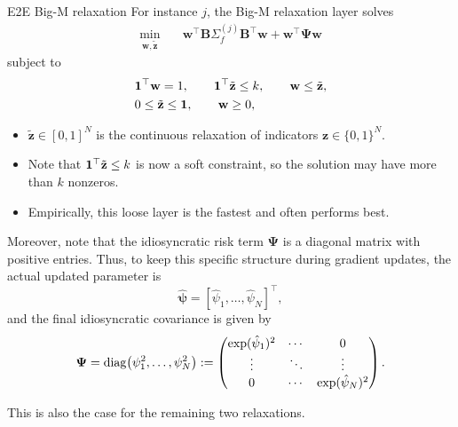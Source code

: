 \documentclass[10pt,aspectratio=169]{beamer}
\newcommand{\Nassets}{N}
\newcommand{\Kcard}{k}
\newcommand{\SigmaMat}{\Sigma}
\begin{document}
\begin{frame}[allowframebreaks]{E2E Big-M relaxation}
  \small 
  For instance $j$, the Big-M relaxation layer solves
  \[
  \begin{aligned}
    \min_{\mathbf w,\tilde{\mathbf z}}\quad 
    &  \mathbf w^\top \mathbf{B} \SigmaMat_f^{(j)} \mathbf{B}^\top \mathbf{w} + \mathbf{w}^\top \boldsymbol{\Psi} \mathbf{w}
    \end{aligned}
  \]
  subject to
  \[
  \begin{aligned}
    & \one^\top \mathbf w=1,\qquad
      \one^\top \tilde{\mathbf z}\le \Kcard,\qquad
      \mathbf w\le \tilde{\mathbf z},\\
    & 0\le \tilde{\mathbf z}\le \one,\qquad
      \mathbf w\ge0,
  \end{aligned}
  \]

  \begin{remark}
      \begin{itemize}
      \item $\tilde{\mathbf z}\in[0,1]^\Nassets$ is the continuous relaxation of indicators $\mathbf{z}\in\{0,1\}^\Nassets$.
      \item Note that $\one^\top \tilde{\mathbf z}\le \Kcard$ is now a soft constraint, so the solution may have more than $k$ nonzeros.
      \item Empirically, this loose layer is the fastest and often performs best.
  \end{itemize}
    
  \end{remark}
  
  \break

  Moreover, note that the idiosyncratic risk term $\boldsymbol{\Psi}$ is a diagonal matrix with positive entries. Thus, to keep this specific structure during gradient updates, the actual updated parameter is
  \[
    \hat{\boldsymbol{\psi}} = [\hat{\psi}_1,\ldots,\hat{\psi}_\Nassets]^\top,
    \]
  and the final idiosyncratic covariance is given by
  \[
    \boldsymbol{\Psi} = 
      \diag\!\left(\psi_1^2,\ldots,\psi_\Nassets^2\right)
    := \begin{pmatrix}
      \exp(\hat{\psi}_1)^2  & \cdots & 0 \\
      \vdots  & \ddots & \vdots \\
      0  & \cdots & \exp(\hat{\psi}_\Nassets)^2
    \end{pmatrix}.
  \]

  This is also the case for the remaining two relaxations.


\end{frame}
\end{document}

